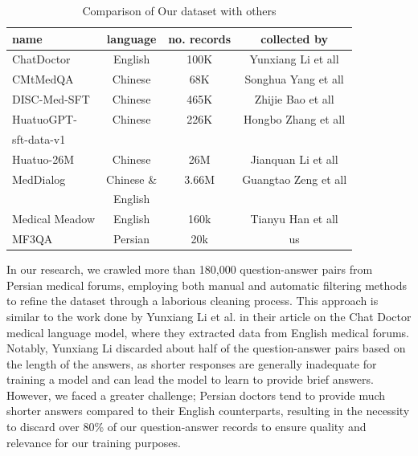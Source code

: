 \documentclass[conference]{IEEEtran}
\begin{document}
\begin{table}[ht]
	\centering
	\caption{Comparison of Our dataset with others}
	\begin{tabular}{|l|c|c|c|}  %
		\hline
   name            &language & no. records & collected by \\ \hline
   ChatDoctor 	   &English	 & 100K        & Yunxiang Li et all
   \cite{b6}
    \\ \hline
   CMtMedQA  	   &Chinese	 & 68K        &  Songhua Yang et all
   \cite{b19}
   \\ \hline
   DISC-Med-SFT	   &Chinese	 & 465K       & Zhijie Bao et all   
   \cite{b20}
   \\ \hline
   HuatuoGPT-	   &Chinese	 & 226K        & Hongbo Zhang et all   
   \cite{b21}
    \\ 
   sft-data-v1	   &	     &             & 	\\ \hline
   Huatuo-26M	   &Chinese	 & 26M         & Jianquan Li et all 
   \cite{b22}
   \\ \hline
   MedDialog       &Chinese \&&3.66M       & Guangtao Zeng et all  \\ 
                   &English  &             &  \cite{b23} \\ \hline
   Medical Meadow  &English  & 160k        & Tianyu Han et all 
   \cite{b24}
   \\ \hline
   MF3QA           &Persian  & 20k            & us \\ \hline
	\end{tabular}
	\label{tab:model_results_on_mcqa}
\end{table}


In our research, we crawled more than 180,000 question-answer pairs from Persian medical forums, employing both manual and automatic filtering methods to refine the dataset through a laborious cleaning process. This approach is similar to the work done by Yunxiang Li et al. \cite{b6} in their article on the Chat Doctor medical language model, where they extracted data from English medical forums. Notably, Yunxiang Li discarded about half of the question-answer pairs based on the length of the answers, as shorter responses are generally inadequate for training a model and can lead the model to learn to provide brief answers. However, we faced a greater challenge; Persian doctors tend to provide much shorter answers compared to their English counterparts, resulting in the necessity to discard over 80\% of our question-answer records to ensure quality and relevance for our training purposes.
\end{document}
